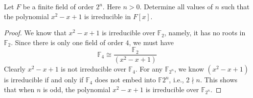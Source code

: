\documentclass[openany]{book}
\newcommand{\F}{\mathbb{F}}
\begin{document}
\begin{prob}
    Let \(F\) be a finite field of order \(2^{n}\). Here \(n>0\). Determine all values of \(n\) such that the polynomial \(x^{2}-x+1\) is irreducible in \(F[x]\).
\end{prob}
\begin{proof}
    We know that $x^2-x+1$ is irreducible over $\F_2$, namely, it has no roots in $\F_2$. Since there is only one field of order $4$, we must have 
    \begin{equation*}
        \F_4\cong\frac{\F_2}{(x^2-x+1)}
    \end{equation*}
    Clearly $x^2-x+1$ is not irreducible over $\F_4$. For any $\F_{2^n}$, we know $(x^2-x+1)$ is irreducible if and only if $\F_4$ does not embed into $\F{2^n}$, i.e., $2\nmid n$. This shows that when $n$ is odd, the polynomial $x^2-x+1$ is irreducible over $\F_{2^n}$.
\end{proof}
\end{document}
